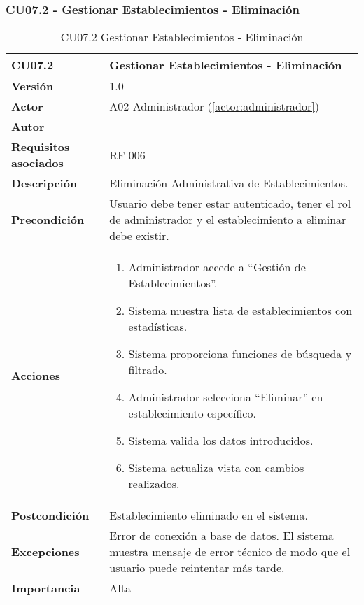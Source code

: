\subsubsection{CU07.2 - Gestionar Establecimientos - Eliminación}

\begin{table}[H]
	\centering
	\begin{tabularx}{\linewidth}{ p{} p{} }
		\toprule
		\textbf{CU07.2}    & \textbf{Gestionar Establecimientos - Eliminación} \\
		\toprule
		\textbf{Versión}              & 1.0    \\
		\textbf{Actor}                & A02 Administrador (\ref{actor:administrador}) \\
		\textbf{Autor}                & \nombre \\
		\textbf{Requisitos asociados} & RF-006 \\
		\textbf{Descripción}          & Eliminación Administrativa de Establecimientos. \\
		\textbf{Precondición}         & Usuario debe tener estar autenticado, tener el rol de administrador y el establecimiento a eliminar debe existir. \\
		\textbf{Acciones}             &
		\begin{enumerate}
			\def\labelenumi{\arabic{enumi}.}
			\tightlist
			\item Administrador accede a ``Gestión de Establecimientos''.
            \item Sistema muestra lista de establecimientos con estadísticas.
            \item Sistema proporciona funciones de búsqueda y filtrado.
            \item Administrador selecciona ``Eliminar'' en establecimiento específico.
            \item Sistema valida los datos introducidos.
            \item Sistema actualiza vista con cambios realizados.
		\end{enumerate}\\
		\textbf{Postcondición}        & Establecimiento eliminado en el sistema. \\
		\textbf{Excepciones}          & Error de conexión a base de datos. El sistema muestra mensaje de error técnico de modo que el usuario puede reintentar más tarde.\\
		\textbf{Importancia}          & Alta \\
		\bottomrule
	\end{tabularx}
	\caption{CU07.2 Gestionar Establecimientos - Eliminación}
	\label{cu:gestionar-establecimientos-eliminacion}
\end{table}










